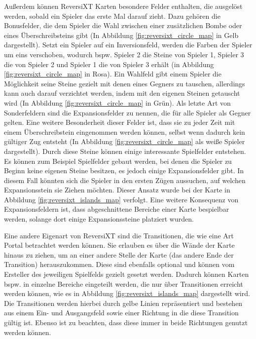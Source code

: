 \documentclass[12pt,a4paper,bibliography=totocnumbered,listof=totocnumbered]{article}
\begin{document}
Außerdem können ReversiXT Karten besondere Felder enthalten, die ausgelöst werden, sobald ein Spieler das erste Mal darauf zieht. Dazu gehören die Bonusfelder, die dem Spieler die Wahl zwischen einer zusätzlichen Bombe oder eines Überschreibsteins gibt (In Abbildung \ref{fig:reversixt_circle_map} in Gelb dargestellt). Setzt ein Spieler auf ein Inversionsfeld, werden die Farben der Spieler um eins verschoben, wodurch bspw. Spieler 2 die Steine von Spieler 1, Spieler 3 die von Spieler 2 und Spieler 1 die von Spieler 3 erhält (in Abbildung \ref{fig:reversixt_circle_map} in Rosa). Ein Wahlfeld gibt einem Spieler die Möglichkeit seine Steine gezielt mit denen eines Gegners zu tauschen, allerdings kann auch darauf verzichtet werden, indem mit den eigenen Steinen \glqq getauscht\grqq{} wird (In Abbildung \ref{fig:reversixt_circle_map} in Grün). Als letzte Art von Sonderfeldern sind die Expansionsfelder zu nennen, die für alle Spieler als Gegner gelten. Eine weitere Besonderheit dieser Felder ist, dass sie zu jeder Zeit mit einem Überschreibstein eingenommen werden können, selbst wenn dadurch kein gültiger Zug entsteht (In Abbildung \ref{fig:reversixt_circle_map} als weiße Spieler dargestellt). Durch diese Steine können einige interessante Spielfelder entstehen. Es können zum Beispiel Spielfelder gebaut werden, bei denen die Spieler zu Beginn keine eigenen Steine besitzen, es jedoch einige Expansionsfelder gibt. In diesem Fall könnten sich die Spieler in den ersten Zügen aussuchen, auf welchen Expansionsstein sie Ziehen möchten. Dieser Ansatz wurde bei der Karte in Abbildung \ref{fig:reversixt_islands_map} verfolgt. Eine weitere Konsequenz von Expansionsfeldern ist, dass abgeschnittene Bereiche einer Karte bespielbar werden, solange dort einige Expansionssteine platziert wurden.

Eine andere Eigenart von ReversiXT sind die Transitionen, die wie eine Art Portal betrachtet werden können. Sie erlauben es über die Wände der Karte hinaus zu ziehen, um an einer andere Stelle der Karte (das andere Ende der Transition) herauszukommen. Diese sind ebenfalls optional und können vom Ersteller des jeweiligen Spielfelds gezielt gesetzt werden. Dadurch können Karten bspw. in einzelne Bereiche eingeteilt werden, die nur über Transitionen erreicht werden können, wie es in Abbildung \ref{fig:reversixt_islands_map} dargestellt wird. Die Transitionen werden hierbei durch gelbe Linien repräsentiert und bestehen aus einem Ein- und Ausgangsfeld sowie einer Richtung in die diese Transition gültig ist. Ebenso ist zu beachten, dass diese immer in beide Richtungen genutzt werden können.
\end{document}
